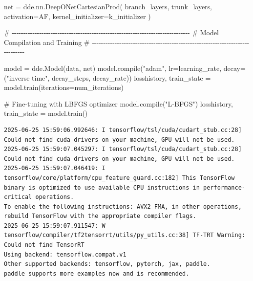 \documentclass[
  spanish,
  us-letterpaper,
  DIV=11,
  numbers=noendperiod]{scrreprt}
\newenvironment{Shaded}{\begin{snugshade}}{\end{snugshade}}
\newcommand{\BuiltInTok}[1]{\textcolor[rgb]{0.00,0.23,0.31}{#1}}
\newcommand{\CommentTok}[1]{\textcolor[rgb]{0.37,0.37,0.37}{#1}}
\newcommand{\NormalTok}[1]{\textcolor[rgb]{0.00,0.23,0.31}{#1}}
\newcommand{\OperatorTok}[1]{\textcolor[rgb]{0.37,0.37,0.37}{#1}}
\newcommand{\StringTok}[1]{\textcolor[rgb]{0.13,0.47,0.30}{#1}}
\theoremstyle{definition}
\theoremstyle{plain}
\theoremstyle{remark}
\begin{document}
\begin{Shaded}
\begin{Highlighting}[]
\NormalTok{net }\OperatorTok{=}\NormalTok{ dde.nn.DeepONetCartesianProd(}
\NormalTok{    branch\_layers,}
\NormalTok{    trunk\_layers,}
\NormalTok{    activation}\OperatorTok{=}\NormalTok{AF,}
\NormalTok{    kernel\_initializer}\OperatorTok{=}\NormalTok{k\_initializer}
\NormalTok{)}

\CommentTok{\# {-}{-}{-}{-}{-}{-}{-}{-}{-}{-}{-}{-}{-}{-}{-}{-}{-}{-}{-}{-}{-}{-}{-}{-}{-}{-}{-}{-}{-}{-}{-}{-}{-}{-}{-}{-}{-}{-}{-}{-}{-}{-}{-}{-}{-}{-}{-}{-}{-}{-}{-}{-}{-}{-}{-}{-}{-}{-}{-}{-}{-}{-}{-}{-}{-}{-}{-}{-}{-}{-}{-}{-}{-}{-}{-}{-}{-}{-}}
\CommentTok{\# Model Compilation and Training}
\CommentTok{\# {-}{-}{-}{-}{-}{-}{-}{-}{-}{-}{-}{-}{-}{-}{-}{-}{-}{-}{-}{-}{-}{-}{-}{-}{-}{-}{-}{-}{-}{-}{-}{-}{-}{-}{-}{-}{-}{-}{-}{-}{-}{-}{-}{-}{-}{-}{-}{-}{-}{-}{-}{-}{-}{-}{-}{-}{-}{-}{-}{-}{-}{-}{-}{-}{-}{-}{-}{-}{-}{-}{-}{-}{-}{-}{-}{-}{-}{-}}

\NormalTok{model }\OperatorTok{=}\NormalTok{ dde.Model(data, net)}
\NormalTok{model.}\BuiltInTok{compile}\NormalTok{(}\StringTok{"adam"}\NormalTok{, lr}\OperatorTok{=}\NormalTok{learning\_rate, decay}\OperatorTok{=}\NormalTok{(}\StringTok{"inverse time"}\NormalTok{, decay\_steps, decay\_rate))}
\NormalTok{losshistory, train\_state }\OperatorTok{=}\NormalTok{ model.train(iterations}\OperatorTok{=}\NormalTok{num\_iterations)}

\CommentTok{\# Fine{-}tuning with LBFGS optimizer}
\NormalTok{model.}\BuiltInTok{compile}\NormalTok{(}\StringTok{"L{-}BFGS"}\NormalTok{)}
\NormalTok{losshistory, train\_state }\OperatorTok{=}\NormalTok{ model.train()}
\end{Highlighting}
\end{Shaded}

\begin{verbatim}
2025-06-25 15:59:06.992646: I tensorflow/tsl/cuda/cudart_stub.cc:28] Could not find cuda drivers on your machine, GPU will not be used.
2025-06-25 15:59:07.045297: I tensorflow/tsl/cuda/cudart_stub.cc:28] Could not find cuda drivers on your machine, GPU will not be used.
2025-06-25 15:59:07.046419: I tensorflow/core/platform/cpu_feature_guard.cc:182] This TensorFlow binary is optimized to use available CPU instructions in performance-critical operations.
To enable the following instructions: AVX2 FMA, in other operations, rebuild TensorFlow with the appropriate compiler flags.
2025-06-25 15:59:07.911547: W tensorflow/compiler/tf2tensorrt/utils/py_utils.cc:38] TF-TRT Warning: Could not find TensorRT
Using backend: tensorflow.compat.v1
Other supported backends: tensorflow, pytorch, jax, paddle.
paddle supports more examples now and is recommended.
\end{verbatim}
\end{document}
